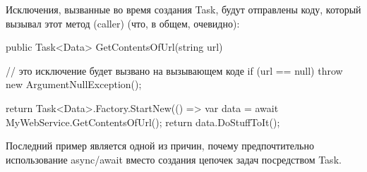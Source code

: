 Исключения, вызванные во время создания Task, будут отправлены коду, который вызывал этот метод (caller) (что, в общем, очевидно):

public Task<Data> GetContentsOfUrl(string url)
{
    // это исключение будет вызвано на вызывающем коде
    if (url == null) throw new ArgumentNullException();

    return Task<Data>.Factory.StartNew(() =>
    {
        var data = await MyWebService.GetContentsOfUrl();
        return data.DoStuffToIt();
    }
}

Последний пример является одной из причин, почему предпочтительно использование async/await вместо создания цепочек задач посредством Task.